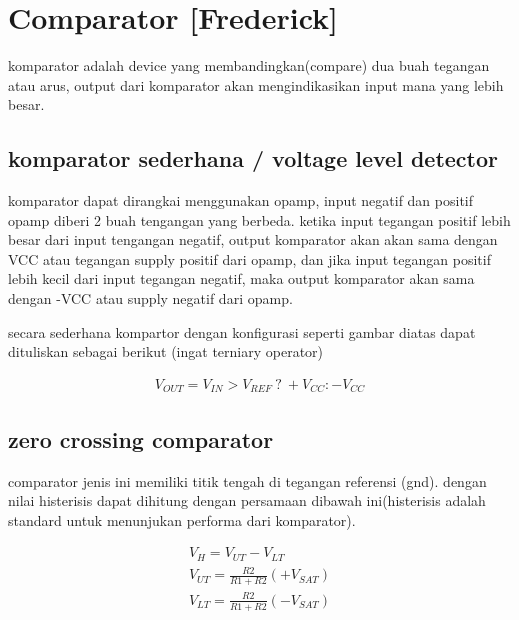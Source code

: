 \graphicspath{{./img/}}


\section{Comparator [Frederick]}
komparator adalah device yang membandingkan(compare) dua buah tegangan atau arus, output dari komparator akan 
mengindikasikan input mana yang lebih besar. 

\subsection{komparator sederhana / voltage level detector}


komparator dapat dirangkai menggunakan opamp, input negatif dan positif opamp diberi 2 buah tengangan yang berbeda.
ketika input tegangan positif lebih besar dari input tengangan negatif, output komparator akan akan sama dengan VCC 
atau tegangan supply positif dari opamp, dan jika input tegangan positif lebih kecil dari input tegangan negatif, 
maka output komparator akan sama dengan -VCC atau supply negatif dari opamp.

secara sederhana kompartor dengan konfigurasi seperti gambar diatas dapat dituliskan sebagai berikut (ingat terniary operator)

\begin{gather}
  V_{OUT} = V_{IN} > V_{REF} \: ? \: +V_{CC} : -V_{CC} 
\end{gather}


\subsection{zero crossing comparator}

comparator jenis ini memiliki titik tengah di tegangan referensi (gnd). dengan nilai histerisis dapat dihitung dengan 
persamaan dibawah ini(histerisis adalah standard untuk menunjukan performa dari komparator).

\begin{gather}
  V_H = V_{UT} - V_{LT} \\
  V_{UT} = \frac{R2}{R1 + R2} (+V_{SAT})\\
  V_{LT} = \frac{R2}{R1 + R2} (-V_{SAT})
\end{gather}


